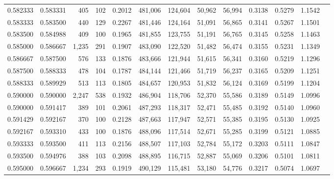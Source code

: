 \begin{tabular}{rrrrrrrrrrrrr}
0.582333 & 0.583331 &   405 & 102 &                                     0.2012 & 481,006 & 124,604 &  50,962 &  56,994 & 0.3138 & 0.5279 & 1.1542 \\
0.583333 & 0.583500 &   440 & 129 &                                     0.2267 & 481,446 & 124,164 &  51,091 &  56,865 & 0.3141 & 0.5267 & 1.1501 \\
0.583500 & 0.584988 &   409 & 100 &                                     0.1965 & 481,855 & 123,755 &  51,191 &  56,765 & 0.3145 & 0.5258 & 1.1463 \\
0.585000 & 0.586667 & 1,235 & 291 &                                     0.1907 & 483,090 & 122,520 &  51,482 &  56,474 & 0.3155 & 0.5231 & 1.1349 \\
0.586667 & 0.587500 &   576 & 133 &                                     0.1876 & 483,666 & 121,944 &  51,615 &  56,341 & 0.3160 & 0.5219 & 1.1296 \\
0.587500 & 0.588333 &   478 & 104 &                                     0.1787 & 484,144 & 121,466 &  51,719 &  56,237 & 0.3165 & 0.5209 & 1.1251 \\
0.588333 & 0.589929 &   513 & 113 &                                     0.1805 & 484,657 & 120,953 &  51,832 &  56,124 & 0.3169 & 0.5199 & 1.1204 \\
0.590000 & 0.590000 & 2,247 & 538 &                                     0.1932 & 486,904 & 118,706 &  52,370 &  55,586 & 0.3189 & 0.5149 & 1.0996 \\
0.590000 & 0.591417 &   389 & 101 &                                     0.2061 & 487,293 & 118,317 &  52,471 &  55,485 & 0.3192 & 0.5140 & 1.0960 \\
0.591429 & 0.592167 &   370 & 100 &                                     0.2128 & 487,663 & 117,947 &  52,571 &  55,385 & 0.3195 & 0.5130 & 1.0925 \\
0.592167 & 0.593310 &   433 & 100 &                                     0.1876 & 488,096 & 117,514 &  52,671 &  55,285 & 0.3199 & 0.5121 & 1.0885 \\
0.593333 & 0.593500 &   411 & 113 &                                     0.2156 & 488,507 & 117,103 &  52,784 &  55,172 & 0.3203 & 0.5111 & 1.0847 \\
0.593500 & 0.594976 &   388 & 103 &                                     0.2098 & 488,895 & 116,715 &  52,887 &  55,069 & 0.3206 & 0.5101 & 1.0811 \\
0.595000 & 0.596667 & 1,234 & 293 &                                     0.1919 & 490,129 & 115,481 &  53,180 &  54,776 & 0.3217 & 0.5074 & 1.0697 \\

\end{tabular}
